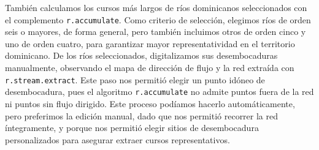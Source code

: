 \documentclass[spanish]{article}
\begin{document}
También calculamos los cursos más largos de ríos dominicanos
seleccionados con el complemento \texttt{r.accumulate}. Como criterio de
selección, elegimos ríos de orden seis o mayores, de forma general, pero
también incluimos otros de orden cinco y uno de orden cuatro, para
garantizar mayor representatividad en el territorio dominicano. De los
ríos seleccionados, digitalizamos sus desembocaduras manualmente,
observando el mapa de dirección de flujo y la red extraída con
\texttt{r.stream.extract}. Este paso nos permitió elegir un punto idóneo
de desembocadura, pues el algoritmo \texttt{r.accumulate} no admite
puntos fuera de la red ni puntos sin flujo dirigido. Este proceso
podíamos hacerlo automáticamente, pero preferimos la edición manual,
dado que nos permitió recorrer la red íntegramente, y porque nos
permitió elegir sitios de desembocadura personalizados para asegurar
extraer cursos representativos.
\end{document}
